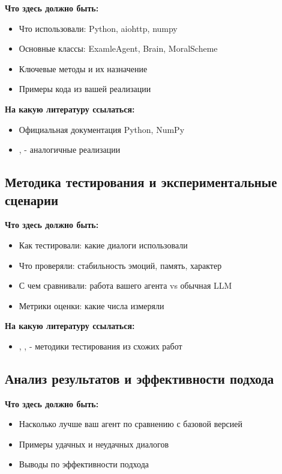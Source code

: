 \documentclass[a4paper,14pt]{extarticle}
\begin{document}
\textbf{Что здесь должно быть:}
\begin{itemize}
\item Что использовали: Python, aiohttp, numpy
\item Основные классы: ExamleAgent, Brain, MoralScheme
\item Ключевые методы и их назначение
\item Примеры кода из вашей реализации
\end{itemize}

\textbf{На какую литературу ссылаться:}
\begin{itemize}
\item Официальная документация Python, NumPy
\item \cite{6}, \cite{7} - аналогичные реализации
\end{itemize}

\subsection{Методика тестирования и экспериментальные сценарии}

\textbf{Что здесь должно быть:}
\begin{itemize}
\item Как тестировали: какие диалоги использовали
\item Что проверяли: стабильность эмоций, память, характер
\item С чем сравнивали: работа вашего агента vs обычная LLM
\item Метрики оценки: какие числа измеряли
\end{itemize}

\textbf{На какую литературу ссылаться:}
\begin{itemize}
\item \cite{6}, \cite{7}, \cite{8} - методики тестирования из схожих работ
\end{itemize}

\subsection{Анализ результатов и эффективности подхода}

\textbf{Что здесь должно быть:}
\begin{itemize}
\item Насколько лучше ваш агент по сравнению с базовой версией
\item Примеры удачных и неудачных диалогов
\item Выводы по эффективности подхода
\end{itemize}
\end{document}
